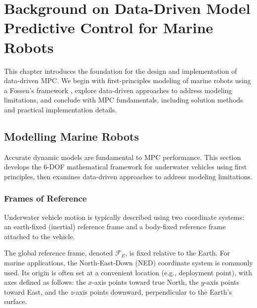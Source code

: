 




\chapter{Background on Data-Driven Model Predictive Control for Marine Robots}
\label{ch:background}

This chapter introduces the foundation for the design and implementation of data-driven MPC. We begin with first-principles modeling of marine robots using a Fossen's framework \cite{fossen}, explore data-driven approaches to address modeling limitations, and conclude with MPC fundamentals, including solution methods and practical implementation details.

\section{Modelling Marine Robots}
\label{sec:modelling}
Accurate dynamic models are fundamental to MPC performance. This section develops the 6-DOF mathematical framework for underwater vehicles using first principles, then examines data-driven approaches to address modeling limitations.
\subsection{Frames of Reference}
Underwater vehicle motion is typically described using two coordinate systems: an earth-fixed (inertial) reference frame and a body-fixed reference frame attached to the vehicle.

The global reference frame, denoted $\mathcal{F}_E$, is fixed relative to the Earth. For marine applications, the North-East-Down (NED) coordinate system is commonly used. Its origin is often set at a convenient location (e.g., deployment point), with axes defined as follows: the $x$-axis points toward true North, the $y$-axis points toward East, and the $z$-axis points downward, perpendicular to the Earth's surface.

